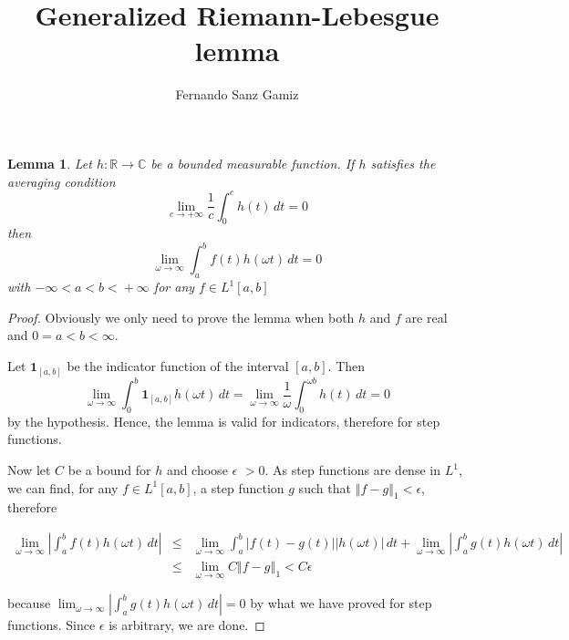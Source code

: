\documentclass[12pt]{article}
\newtheorem{lem}{Lemma}
\newcommand{\norm}[1]{\left\Vert#1\right\Vert}
\newcommand{\abs}[1]{\left\vert#1\right\vert}
\newcommand{\Real}{\mathbb R}
\newcommand{\Complex}{\mathbb C}
\begin{document}
\title{Generalized Riemann-Lebesgue lemma}%
\author{Fernando Sanz Gamiz}%


\begin{lem} Let $h \colon \Real \to \Complex$ be a bounded measurable function.
If $h$ satisfies the \emph{averaging condition} $$\lim_{c \to
+\infty} \frac{1}{c} \int_0^c h(t) \,d t=0$$ then $$\lim_{\omega \to
\infty} \int_a^b f(t)h(\omega t) \,d t=0$$ with $ -\infty <
\! a < b < \! +\infty$ for any $f \in L^1[a,b]$

\end{lem}

\begin{proof}
Obviously we only need to prove the lemma when both $h$ and $f$ are
real and $0=a<b<\infty$.

\smallskip

\noindent Let $\mathbf 1_{[a,b]}$ be the indicator function of the
interval $[a,b]$. Then
$$\lim_{\omega \to \infty} \int_0^b \mathbf 1_{[a,b]} h(\omega t) \,d t= \lim_{\omega \to \infty} \frac{1}{\omega} \int_0^{\omega b} h(t) \,d
t=0$$ by the hypothesis. Hence, the lemma is valid for indicators,
therefore for step functions.

\noindent Now let $C$ be a bound for $h$ and choose $\epsilon$ $>0$.
As step functions are dense in $L^1$, we can find, for any $f\in
L^1[a,b]$, a step function $g$ such that $\norm{f-g}_1<\epsilon$,
therefore

\begin{eqnarray*}
\lim_{\omega \to \infty} \abs{\int_a^b f(t)h(\omega t)\,d t}  &
\leqslant & \lim_{\omega \to \infty} \int_a^b \abs{f(t)-g(t)}
\abs{h(\omega t)} \,d t + \lim_{\omega \to \infty} \abs{\int_a^b
g(t)h(\omega t) \,d t}
\\ & \leqslant & \lim_{\omega \to \infty} C\norm{f-g}_1 < C\epsilon
\end{eqnarray*}

\noindent because $\lim_{\omega \to \infty} \abs{\int_a^b
g(t)h(\omega t) \,d t}=0$ by what we have proved for step
functions. Since $\epsilon$ is arbitrary, we are done.

\end{proof}
\end{document}

